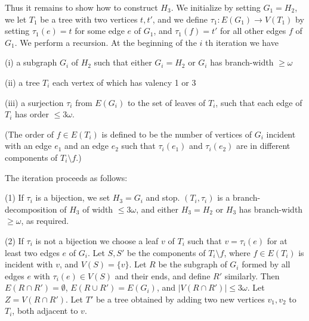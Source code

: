 Thus it remains to show how to construct $H_3$. We initialize by setting $G_1 = H_2$, we let $T_1$ be a tree with two vertices $t, t'$, and we define $\tau_1 \colon E(G_1) \to V(T_1)$ by setting $\tau_1(e) = t$ for some edge $e$ of $G_1$, and $\tau_1(f) = t'$ for all other edges $f$ of $G_1$. We perform a recursion. At the beginning of the $i$ th iteration we have

\hspace*{12pt}(i) a subgraph $G_i$ of $H_2$ such that either $G_i = H_2$ or $G_i$ has branch-width $\ge \omega$

\hspace*{12pt}(ii) a tree $T_i$ each vertex of which has valency 1 or 3

\hspace*{12pt}(iii) a surjection $\tau_i$ from $E(G_i)$ to the set of leaves of $T_i$, such that each edge of $T_i$ has order $\le 3\omega$.

(The order of $f \in E(T_i)$ is defined to be the number of vertices of $G_i$ incident with an edge $e_1$ and an edge $e_2$ such that $\tau_i(e_1)$ and $\tau_i(e_2)$ are in different components of $T_i \setminus f$.)

The iteration proceeds as follows:

\hspace*{12pt}(1) If $\tau_i$ is a bijection, we set $H_3 = G_i$ and stop. $(T_i, \tau_i)$ is a branch-decomposition of $H_3$ of width $\le 3\omega$, and either $H_3 = H_2$ or $H_3$ has branch-width $\ge \omega$, as required.

\hspace*{12pt}(2) If $\tau_i$ is not a bijection we choose a leaf $v$ of $T_i$ such that $v = \tau_i(e)$ for at least two edges $e$ of $G_i$. Let $S, S'$ be the components of $T_i \setminus f$, where $f \in E(T_i)$ is incident with $v$, and $V(S) = \{v\}$. Let $R$ be the subgraph of $G_i$ formed by all edges $e$ with $\tau_i(e) \in V(S)$ and their ends, and define $R'$ similarly. Then $E(R \cap R') = \emptyset$, $E(R \cup R') = E(G_i)$, and $|V(R \cap R')| \le 3\omega$. Let $Z = V(R \cap R')$. Let $T'$ be a tree obtained by adding two new vertices $v_1, v_2$ to $T_i$, both adjacent to $v$.

